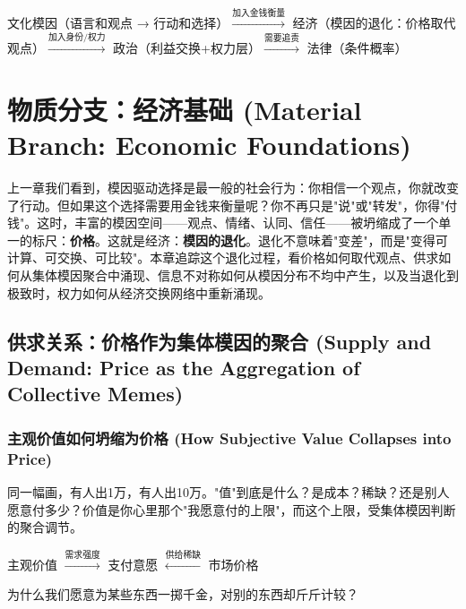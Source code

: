 \documentclass[../main.tex]{subfiles}
\begin{document}
	\begin{logicmap}
		文化模因（语言和观点 → 行动和选择）$\xrightarrow{\text{加入金钱衡量}}$ 经济（模因的退化：价格取代观点）$\xrightarrow{\text{加入身份/权力}}$ 政治（利益交换+权力层）$\xrightarrow{\text{需要追责}}$ 法律（条件概率）
	\end{logicmap}

	\chapter{物质分支：经济基础 (Material Branch: Economic Foundations)}
	\begin{motivation}
		上一章我们看到，模因驱动选择是最一般的社会行为：你相信一个观点，你就改变了行动。但如果这个选择需要用金钱来衡量呢？你不再只是"说"或"转发"，你得"付钱"。这时，丰富的模因空间——观点、情绪、认同、信任——被坍缩成了一个单一的标尺：\textbf{价格}。这就是经济：\textbf{模因的退化}。退化不意味着"变差"，而是"变得可计算、可交换、可比较"。本章追踪这个退化过程，看价格如何取代观点、供求如何从集体模因聚合中涌现、信息不对称如何从模因分布不均中产生，以及当退化到极致时，权力如何从经济交换网络中重新涌现。
	\end{motivation}

	\section{供求关系：价格作为集体模因的聚合 (Supply and Demand: Price as the Aggregation of Collective Memes)}

	\subsection{主观价值如何坍缩为价格 (How Subjective Value Collapses into Price)}
	\begin{motivation}
		同一幅画，有人出1万，有人出10万。"值"到底是什么？是成本？稀缺？还是别人愿意付多少？价值是你心里那个"我愿意付的上限"，而这个上限，受集体模因判断的聚合调节。
	\end{motivation}
	\begin{logicmap}
		主观价值 $\xrightarrow{\text{需求强度}}$ 支付意愿 $\xleftarrow{\text{供给稀缺}}$ 市场价格
	\end{logicmap}
	\begin{questionbox}
		为什么我们愿意为某些东西一掷千金，对别的东西却斤斤计较？
	\end{questionbox}
\end{document}
